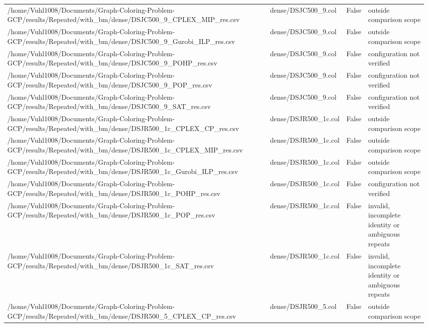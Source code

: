 \begin{table}[htbp]
\begin{tabular}{llll}
/home/Vuhl1008/Documents/Graph-Coloring-Problem-GCP/results/Repeated/with\_bm/dense/DSJC500\_9\_CPLEX\_MIP\_res.csv & dense/DSJC500\_9.col & False & outside comparison scope \\
/home/Vuhl1008/Documents/Graph-Coloring-Problem-GCP/results/Repeated/with\_bm/dense/DSJC500\_9\_Gurobi\_ILP\_res.csv & dense/DSJC500\_9.col & False & outside comparison scope \\
/home/Vuhl1008/Documents/Graph-Coloring-Problem-GCP/results/Repeated/with\_bm/dense/DSJC500\_9\_POHP\_res.csv & dense/DSJC500\_9.col & False & configuration not verified \\
/home/Vuhl1008/Documents/Graph-Coloring-Problem-GCP/results/Repeated/with\_bm/dense/DSJC500\_9\_POP\_res.csv & dense/DSJC500\_9.col & False & configuration not verified \\
/home/Vuhl1008/Documents/Graph-Coloring-Problem-GCP/results/Repeated/with\_bm/dense/DSJC500\_9\_SAT\_res.csv & dense/DSJC500\_9.col & False & configuration not verified \\
/home/Vuhl1008/Documents/Graph-Coloring-Problem-GCP/results/Repeated/with\_bm/dense/DSJR500\_1c\_CPLEX\_CP\_res.csv & dense/DSJR500\_1c.col & False & outside comparison scope \\
/home/Vuhl1008/Documents/Graph-Coloring-Problem-GCP/results/Repeated/with\_bm/dense/DSJR500\_1c\_CPLEX\_MIP\_res.csv & dense/DSJR500\_1c.col & False & outside comparison scope \\
/home/Vuhl1008/Documents/Graph-Coloring-Problem-GCP/results/Repeated/with\_bm/dense/DSJR500\_1c\_Gurobi\_ILP\_res.csv & dense/DSJR500\_1c.col & False & outside comparison scope \\
/home/Vuhl1008/Documents/Graph-Coloring-Problem-GCP/results/Repeated/with\_bm/dense/DSJR500\_1c\_POHP\_res.csv & dense/DSJR500\_1c.col & False & configuration not verified \\
/home/Vuhl1008/Documents/Graph-Coloring-Problem-GCP/results/Repeated/with\_bm/dense/DSJR500\_1c\_POP\_res.csv & dense/DSJR500\_1c.col & False & invalid, incomplete identity or ambiguous repeats \\
/home/Vuhl1008/Documents/Graph-Coloring-Problem-GCP/results/Repeated/with\_bm/dense/DSJR500\_1c\_SAT\_res.csv & dense/DSJR500\_1c.col & False & invalid, incomplete identity or ambiguous repeats \\
/home/Vuhl1008/Documents/Graph-Coloring-Problem-GCP/results/Repeated/with\_bm/dense/DSJR500\_5\_CPLEX\_CP\_res.csv & dense/DSJR500\_5.col & False & outside comparison scope \\

\end{tabular}
\end{table}
